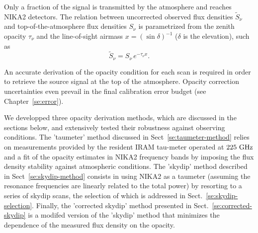 %
%


Only a fraction of the signal is transmitted by the atmosphere and
reaches NIKA2 detectors. 
The relation between uncorrected observed flux densities
$\tilde{S}_{\nu}$ and top-of-the-atmosphere flux densities $S_{\nu}$
is parametrized from the zenith opacity $\tau_{\nu}$
and the line-of-sight airmass $x = \left(\sin\delta\right)^{-1}$ ($\delta$ is the elevation), such as
\begin{equation}
\tilde{S}_{\nu} = S_{\nu} \, e^{-\tau_{\nu}  x}.
\label{eq:uncorr_flux}
\end{equation}

An accurate derivation of the opacity condition for each scan is
required in order to retrieve the source signal at the top of the
atmosphere. Opacity correction uncertainties even prevail in the
final calibration error budget (see Chapter~\ref{se:error}).

We developped three opacity derivation methods, which are discussed in
the sections below, and extensively tested their robustness against
observing conditions. The 'taumeter' method discussed in
Sect~\ref{se:taumeter-method} relies on measurements provided by the
resident IRAM tau-meter operated at $225~\rm{GHz}$ and a fit of the
opacity estimates in NIKA2 frequency bands by imposing the flux
density stability against atmospheric conditions. The 'skydip' method
described in Sect~\ref{se:skydip-method} consists in using NIKA2 as a
taumeter (assuming the resonance frequencies are linearly related to
the total power) by resorting to a series of skydip scans, the
selection of which is addressed in
Sect.~\ref{se:skydip-selection}. Finally, the 'corrected skydip'
method presented in Sect.~\ref{se:corrected-skydip} is a modifed
version of the 'skydip' method that minimizes the dependence of the
measured flux density on the opacity.\\


